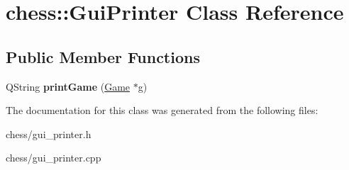 \hypertarget{classchess_1_1GuiPrinter}{\section{chess\-:\-:Gui\-Printer Class Reference}
\label{classchess_1_1GuiPrinter}
}
\subsection*{Public Member Functions}
\begin{DoxyCompactItemize}
\item 
\hypertarget{classchess_1_1GuiPrinter_a89888d217dd3e6aea7ae1d59ce623940}{Q\-String {\bfseries print\-Game} (\hyperlink{classchess_1_1Game}{Game} $\ast$g)}\label{classchess_1_1GuiPrinter_a89888d217dd3e6aea7ae1d59ce623940}

\end{DoxyCompactItemize}


The documentation for this class was generated from the following files\-:\begin{DoxyCompactItemize}
\item 
chess/gui\-\_\-printer.\-h\item 
chess/gui\-\_\-printer.\-cpp\end{DoxyCompactItemize}
